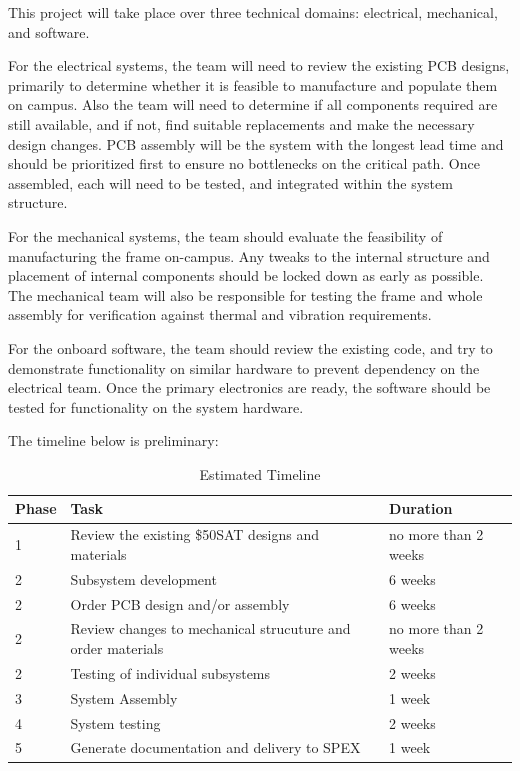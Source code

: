 \documentclass[conference]{IEEEtran} %
\begin{document}
This project will take place over three technical domains: electrical, mechanical, and software.

For the electrical systems, the team will need to review the existing PCB designs, primarily to determine whether it is feasible to manufacture and populate them on campus.
Also the team will need to determine if all components required are still available, and if not, find suitable replacements and make the necessary design changes.
PCB assembly will be the system with the longest lead time and should be prioritized first to ensure no bottlenecks on the critical path.
Once assembled, each will need to be tested, and integrated within the system structure.

For the mechanical systems, the team should evaluate the feasibility of manufacturing the frame on-campus.
Any tweaks to the internal structure and placement of internal components should be locked down as early as possible.
The mechanical team will also be responsible for testing the frame and whole assembly for verification against thermal and vibration requirements.

For the onboard software, the team should review the existing code, and try to demonstrate functionality on similar hardware to prevent dependency on the electrical team.
Once the primary electronics are ready, the software should be tested for functionality on the system hardware.

The timeline below is preliminary:
\begin{table}
  \caption{Estimated Timeline}
  \small\centering
  \begin{tabular}{@{}lll@{}} \toprule
    Phase & Task & Duration \\ \midrule
    1 & Review the existing \$50SAT designs and materials &  no more than 2 weeks \\
    2 & Subsystem development & 6 weeks \\
    2 & Order PCB design and/or assembly & 6 weeks \\
    2 & Review changes to mechanical strucuture and order materials & no more than 2 weeks \\
    2 & Testing of individual subsystems & 2 weeks \\
    3 & System Assembly & 1 week  \\
    4 & System testing & 2 weeks  \\
    5 & Generate documentation and delivery to SPEX & 1 week  \\
    \bottomrule
  \end{tabular}
\label{tab:timeline}
\end{table}
\end{document}
